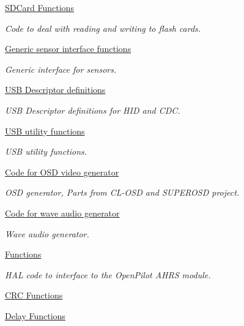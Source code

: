 \begin{DoxyCompactItemize}
\hyperlink{group___p_i_o_s___s_d_c_a_r_d}{\-S\-D\-Card Functions}
\begin{DoxyCompactList}\small\item\em \-Code to deal with reading and writing to flash cards. \end{DoxyCompactList}\item 
\hyperlink{group___p_i_o_s___s_e_n_s_o_r_s}{\-Generic sensor interface functions}
\begin{DoxyCompactList}\small\item\em \-Generic interface for sensors. \end{DoxyCompactList}\item 
\hyperlink{group___p_i_o_s___u_s_b___d_e_s_c}{\-U\-S\-B Descriptor definitions}
\begin{DoxyCompactList}\small\item\em \-U\-S\-B \-Descriptor definitions for \-H\-I\-D and \-C\-D\-C. \end{DoxyCompactList}\item 
\hyperlink{group___p_i_o_s___u_s_b___u_t_i_l}{\-U\-S\-B utility functions}
\begin{DoxyCompactList}\small\item\em \-U\-S\-B utility functions. \end{DoxyCompactList}\item 
\hyperlink{group___p_i_o_s___v_i_d_e_o}{\-Code for O\-S\-D video generator}
\begin{DoxyCompactList}\small\item\em \-O\-S\-D generator, \-Parts from \-C\-L-\/\-O\-S\-D and \-S\-U\-P\-E\-R\-O\-S\-D project. \end{DoxyCompactList}\item 
\hyperlink{group___p_i_o_s___w_a_v_p_l_a_y}{\-Code for wave audio generator}
\begin{DoxyCompactList}\small\item\em \-Wave audio generator. \end{DoxyCompactList}\item 
\hyperlink{group___p_i_o_s___b_o_o_t_l_o_a_d_e_r}{\-Functions}
\begin{DoxyCompactList}\small\item\em \-H\-A\-L code to interface to the \-Open\-Pilot \-A\-H\-R\-S module. \end{DoxyCompactList}\item 
\hyperlink{group___p_i_o_s___c_r_c}{\-C\-R\-C Functions}
\item 
\hyperlink{group___p_i_o_s___d_e_l_a_y}{\-Delay Functions}

\end{DoxyCompactItemize}
